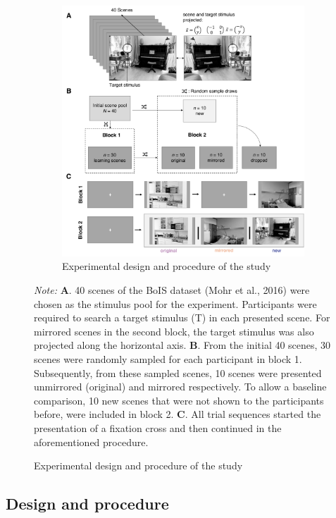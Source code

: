 \documentclass[
  man,floatsintext]{apa7}
\begin{document}
\begin{figure}[H]

\begin{figure}
\caption{Experimental design and procedure of the study \label{fig:experimental-design}}
{\centering \includegraphics[width=0.7\linewidth]{../results/figures/experimental_design} 

}

\end{figure}


\begingroup
\footnotesize
\textit{Note:} \textbf{A}. 40 scenes of the BoIS dataset (Mohr et al., 2016) were chosen as the stimulus pool for the experiment. Participants were required to search a target stimulus (T) in each presented scene. For mirrored scenes in the second block, the target stimulus was also projected along the horizontal axis. \textbf{B}. From the initial 40 scenes, 30 scenes were randomly sampled for each participant in block 1. Subsequently, from these sampled scenes,  10 scenes were presented unmirrored (original) and mirrored respectively. To allow a baseline comparison, 10 new scenes that were not shown to the participants before, were included in block 2. \textbf{C}. All trial sequences started the presentation of a fixation cross and then continued in the aforementioned procedure.
\endgroup
\end{figure}

\hypertarget{design-and-procedure}{%
\subsection{Design and procedure}\label{design-and-procedure}}
\end{document}

